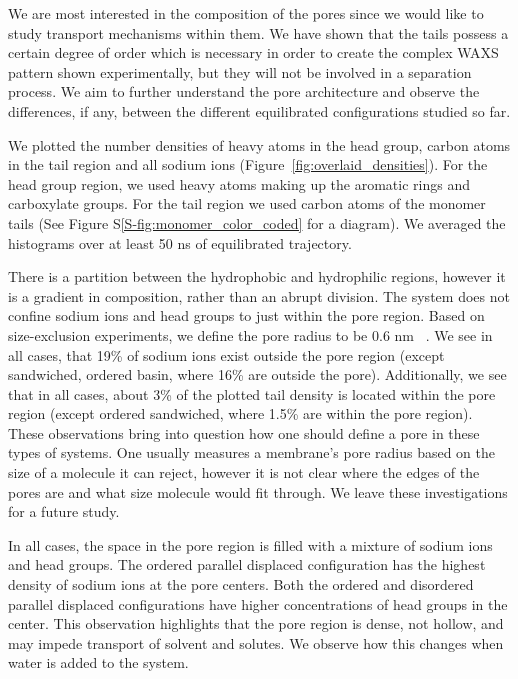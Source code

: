 \documentclass[journal=jpcbfk,manusciprt=article]{achemso}
\begin{document}
  We are most interested in the composition of the pores since we would like to study
  transport mechanisms within them. We have shown that the tails possess a certain degree of order
  which is necessary in order to create the complex WAXS pattern shown experimentally, but
  they will not be involved in a separation process. We aim to further understand the pore
  architecture and observe the differences, if any, between the different equilibrated
  configurations studied so far.

  We plotted the number densities of heavy atoms in the head group, carbon atoms in the tail
  region and all sodium ions (Figure~\ref{fig:overlaid_densities}). For the head group
  region, we used heavy atoms making up the aromatic rings and carboxylate groups. For the tail
  region we used carbon atoms of the monomer tails (See Figure S\ref{S-fig:monomer_color_coded}
  for a diagram). We averaged the histograms over at least 50 ns of equilibrated trajectory.
  
  There is a partition between the hydrophobic and hydrophilic regions, however
  it is a gradient in composition, rather than an abrupt division. The system
  does not confine sodium ions and head groups to just within the pore region.
  Based on size-exclusion experiments, we define the pore radius to be 0.6 nm
  ~\cite{zhou_supported_2005}. We see in all cases, that 19\% of sodium ions
  exist outside the pore region (except sandwiched, ordered basin, where 16\%
  are outside the pore). Additionally, we see that in all cases, about 3\% of the
  plotted tail density is located within the pore region (except ordered sandwiched,
  where 1.5\% are within the pore region). These observations bring into question how
  one should define a pore in these types of systems. One usually measures a 
  membrane's pore radius based on the size of a molecule it can reject, however
  it is not clear where the edges of the pores are and what size molecule would
  fit through. We leave these investigations for a future study.
  
  In all cases, the space in the pore region is filled with a mixture of 
  sodium ions and head groups. The ordered parallel displaced configuration has
  the highest density of sodium ions at the pore centers. Both the ordered and 
  disordered parallel displaced configurations have higher concentrations
  of head groups in the center. This observation highlights that the pore region
  is dense, not hollow, and may impede transport of solvent and solutes. We 
  observe how this changes when water is added to the system.
  
\end{document}
